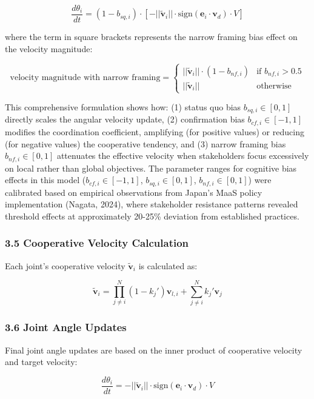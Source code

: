 \[\frac{d\theta_i}{dt} = (1 - b_{sq,i}) \cdot \left[-||\tilde{\mathbf{v}}_i|| \cdot \text{sign}(\mathbf{e}_i \cdot \mathbf{v}_d) \cdot V\right]\]

where the term in square brackets represents the narrow framing bias
effect on the velocity magnitude:

\[\text{velocity magnitude with narrow framing} = \begin{cases}
||\tilde{\mathbf{v}}_i|| \cdot (1 - b_{nf,i}) & \text{if } b_{nf,i} > 0.5 \\
||\tilde{\mathbf{v}}_i|| & \text{otherwise}
\end{cases}\]

This comprehensive formulation shows how: (1) status quo bias
\(b_{sq,i} \in [0,1]\) directly scales the angular velocity update, (2)
confirmation bias \(b_{cf,i} \in [-1,1]\) modifies the coordination
coefficient, amplifying (for positive values) or reducing (for negative
values) the cooperative tendency, and (3) narrow framing bias
\(b_{nf,i} \in [0,1]\) attenuates the effective velocity when
stakeholders focus excessively on local rather than global objectives.
The parameter ranges for cognitive bias effects in this model
(\(b_{cf,i} \in [-1,1]\), \(b_{sq,i} \in [0,1]\),
\(b_{nf,i} \in [0,1]\)) were calibrated based on empirical observations
from Japan's MaaS policy implementation (Nagata, 2024), where
stakeholder resistance patterns revealed threshold effects at
approximately 20-25\% deviation from established practices.

\subsubsection{3.5 Cooperative Velocity
Calculation}\label{cooperative-velocity-calculation}

Each joint's cooperative velocity \(\tilde{\mathbf{v}}_i\) is calculated
as:

\[\tilde{\mathbf{v}}_i = \prod_{j \neq i}^{N} (1 - k_j') \mathbf{v}_{l,i} + \sum_{j \neq i}^{N} k_j' \mathbf{v}_j\]

\subsubsection{3.6 Joint Angle Updates}\label{joint-angle-updates}

Final joint angle updates are based on the inner product of cooperative
velocity and target velocity:

\[\frac{d\theta_i}{dt} = -||\tilde{\mathbf{v}}_i|| \cdot \text{sign}(\mathbf{e}_i \cdot \mathbf{v}_d) \cdot V\]

